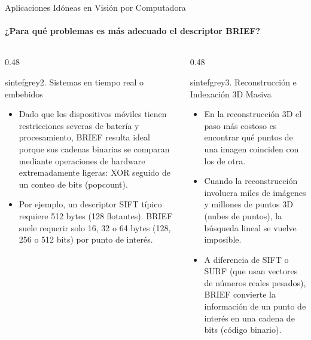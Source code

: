 \documentclass{beamer}
\begin{document}
\begin{frame}{Aplicaciones Idóneas en Visión por Computadora}
\framesubtitle{¿Para qué problemas es más adecuado el descriptor BRIEF?}
\begin{columns}[T]
\begin{column}{0.48\textwidth}
\begin{colorblock}[black]{sintefgrey}{2. Sistemas en tiempo real o embebidos}
\scriptsize
\begin{itemize}\setlength{\itemsep}{2pt}
\item Dado que los dispositivos móviles tienen restricciones severas de batería y procesamiento, BRIEF resulta ideal porque sus cadenas binarias se comparan mediante operaciones de hardware extremadamente ligeras: XOR seguido de un conteo de bits (popcount).

\item Por ejemplo, un descriptor SIFT típico requiere 512 bytes (128 flotantes). BRIEF suele requerir solo 16, 32 o 64 bytes (128, 256 o 512 bits) por punto de interés.
\end{itemize}
\end{colorblock}
\end{column}

\begin{column}{0.48\textwidth}
\begin{colorblock}[black]{sintefgrey}{3. Reconstrucción e Indexación 3D Masiva}
\scriptsize
\begin{itemize}\setlength{\itemsep}{2pt}
    \item En la reconstrucción 3D el paso más costoso es encontrar qué puntos de una imagen coinciden con los de otra.
    \item Cuando la reconstrucción involucra miles de imágenes y millones de puntos 3D (nubes de puntos), la búsqueda lineal se vuelve imposible.
    \item A diferencia de SIFT o SURF (que usan vectores de números reales pesados), BRIEF convierte la información de un punto de interés en una cadena de bits (código binario).
\end{itemize}
\end{colorblock}
\end{column}

\end{columns}
\end{frame}
\end{document}
